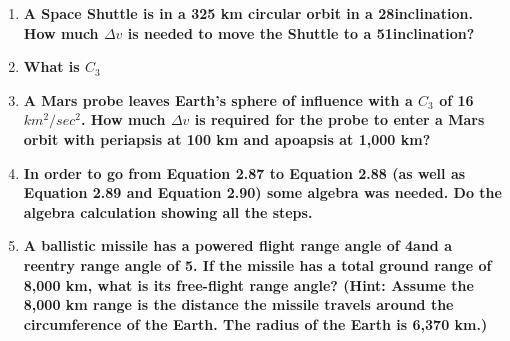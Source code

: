 \begin{enumerate}
	\item {\bf A Space Shuttle is in a 325 km circular orbit in a 28\degree inclination. How much $\Delta v$ is needed to move the Shuttle to a 51\degree inclination?} \\	

	\item {\bf What is $C_3$} \\	

	\item {\bf A Mars probe leaves Earth’s sphere of influence with a $C_3$ of 16 $km^2/sec^2$. How much $\Delta v$ is required for the probe to enter a Mars orbit
with periapsis at 100 km and apoapsis at 1,000 km?} \\	

	\item {\bf In order to go from Equation 2.87 to Equation 2.88 (as well as Equation 2.89 and Equation 2.90) some algebra was needed. Do the algebra calculation showing all the steps.} \\	

	\item {\bf A ballistic missile has a powered flight range angle of 4\degree and a reentry range angle of 5\degree. If the missile has a total ground range of 8,000 km, what is its free-flight range angle? (Hint: Assume the 8,000 km range is the distance the missile travels around the circumference of the Earth. The radius of the Earth is 6,370 km.)} \\	
	
\end{enumerate}


























